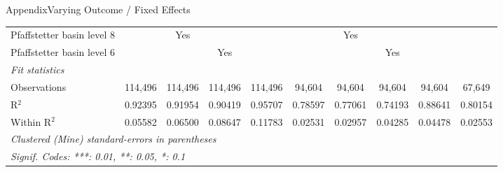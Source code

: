 \documentclass[aspectratio=169,11pt,dvipsnames, handout]{beamer}
\begin{document}
\begin{frame}{\textcolor{defaultclr!30}{Appendix}\hspace{0.75em}Varying Outcome / Fixed Effects}
\begin{adjustbox}{width = \textwidth, center}
\begin{tabular}{lccccccccc}
      Pfaffstetter basin level 8&                 & Yes             &                 &                 &                 & Yes             &                 &                 & \\  
      Pfaffstetter basin level 6&                 &                 & Yes             &                 &                 &                 & Yes             &                 & \\  
      \midrule
      \emph{Fit statistics}\\
      Observations              & 114,496         & 114,496         & 114,496         & 114,496         & 94,604          & 94,604          & 94,604          & 94,604          & 67,649\\  
      R$^2$                     & 0.92395         & 0.91954         & 0.90419         & 0.95707         & 0.78597         & 0.77061         & 0.74193         & 0.88641         & 0.80154\\  
      Within R$^2$              & 0.05582         & 0.06500         & 0.08647         & 0.11783         & 0.02531         & 0.02957         & 0.04285         & 0.04478         & 0.02553\\  
      \midrule \midrule
      \multicolumn{10}{l}{\emph{Clustered (Mine) standard-errors in parentheses}}\\
      \multicolumn{10}{l}{\emph{Signif. Codes: ***: 0.01, **: 0.05, *: 0.1}}\\
   \end{tabular}
\end{adjustbox}



 \centering\hyperlink{frame:robust}{} 
    
\end{frame}

\end{document}
